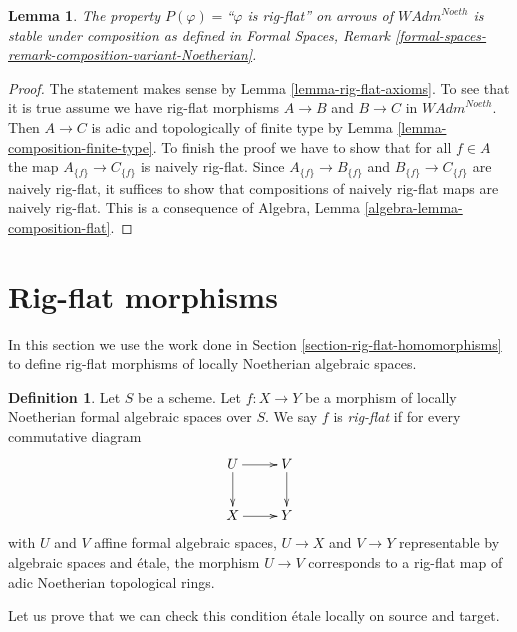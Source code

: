 \documentclass{stacks-project}
\theoremstyle{plain}
\newtheorem{lemma}[subsection]{Lemma}
\theoremstyle{definition}
\newtheorem{definition}[subsection]{Definition}
\theoremstyle{remark}
\numberwithin{equation}{subsection}
\begin{document}
\begin{lemma}
\label{lemma-composition-rig-flat-continuous}
The property $P(\varphi)=$``$\varphi$ is rig-flat''
on arrows of $\textit{WAdm}^{Noeth}$ is stable under composition
as defined in Formal Spaces, Remark
\ref{formal-spaces-remark-composition-variant-Noetherian}.
\end{lemma}

\begin{proof}
The statement makes sense by Lemma \ref{lemma-rig-flat-axioms}.
To see that it is true assume we have rig-flat morphisms
$A \to B$ and $B \to C$ in $\textit{WAdm}^{Noeth}$.
Then $A \to C$ is adic and topologically of finite type
by Lemma \ref{lemma-composition-finite-type}.
To finish the proof we have to show that for all $f \in A$ the map
$A_{\{f\}} \to C_{\{f\}}$ is naively rig-flat.
Since $A_{\{f\}} \to B_{\{f\}}$ and $B_{\{f\}} \to C_{\{f\}}$
are naively rig-flat, it suffices to show that
compositions of naively rig-flat maps are naively rig-flat.
This is a consequence of Algebra, Lemma \ref{algebra-lemma-composition-flat}.
\end{proof}











\section{Rig-flat morphisms}
\label{section-rig-flat-morphisms}

\noindent
In this section we use the work done in
Section \ref{section-rig-flat-homomorphisms}
to define rig-flat morphisms of locally Noetherian algebraic spaces.

\begin{definition}
\label{definition-rig-flat}
Let $S$ be a scheme. Let $f : X \to Y$ be a morphism of locally
Noetherian formal algebraic spaces over $S$. We say $f$ is
{\it rig-flat} if for every commutative diagram
$$
\xymatrix{
U \ar[d] \ar[r] & V \ar[d] \\
X \ar[r] & Y
}
$$
with $U$ and $V$ affine formal algebraic spaces, $U \to X$ and $V \to Y$
representable by algebraic spaces and \'etale, the morphism $U \to V$
corresponds to a rig-flat map of adic Noetherian topological rings.
\end{definition}

\noindent
Let us prove that we can check this condition \'etale locally on
source and target.
\end{document}
